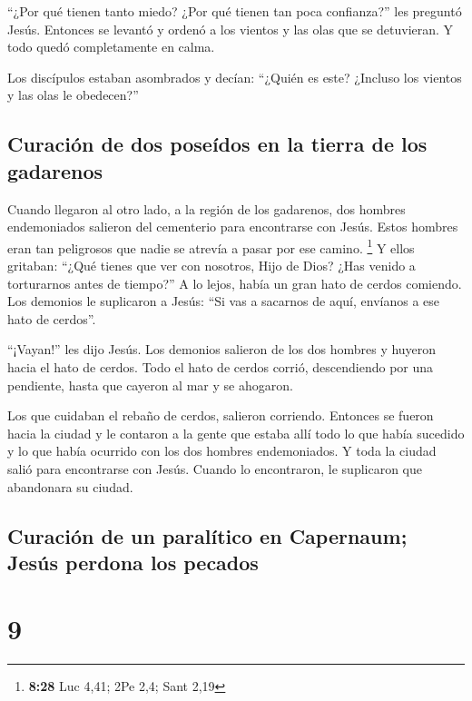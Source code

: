  ``¿Por qué tienen tanto miedo? ¿Por qué tienen tan poca
confianza?'' les preguntó Jesús. Entonces se levantó y ordenó a los
vientos y las olas que se detuvieran. Y todo quedó completamente en
calma.

 Los discípulos estaban asombrados y decían: ``¿Quién es
este? ¿Incluso los vientos y las olas le obedecen?''

\hypertarget{curaciuxf3n-de-dos-poseuxeddos-en-la-tierra-de-los-gadarenos}{%
\subsection{Curación de dos poseídos en la tierra de los
gadarenos}\label{curaciuxf3n-de-dos-poseuxeddos-en-la-tierra-de-los-gadarenos}}

 Cuando llegaron al otro lado, a la región de los
gadarenos, dos hombres endemoniados salieron del cementerio para
encontrarse con Jesús. Estos hombres eran tan peligrosos que nadie se
atrevía a pasar por ese camino. \footnote{\textbf{8:28} Luc 4,41; 2Pe
  2,4; Sant 2,19}  Y ellos gritaban: ``¿Qué tienes que
ver con nosotros, Hijo de Dios? ¿Has venido a torturarnos antes de
tiempo?''  A lo lejos, había un gran hato de cerdos
comiendo.  Los demonios le suplicaron a Jesús: ``Si vas a
sacarnos de aquí, envíanos a ese hato de cerdos''.

 ``¡Vayan!'' les dijo Jesús. Los demonios salieron de los
dos hombres y huyeron hacia el hato de cerdos. Todo el hato de cerdos
corrió, descendiendo por una pendiente, hasta que cayeron al mar y se
ahogaron.

 Los que cuidaban el rebaño de cerdos, salieron
corriendo. Entonces se fueron hacia la ciudad y le contaron a la gente
que estaba allí todo lo que había sucedido y lo que había ocurrido con
los dos hombres endemoniados.  Y toda la ciudad salió
para encontrarse con Jesús. Cuando lo encontraron, le suplicaron que
abandonara su ciudad.

\hypertarget{curaciuxf3n-de-un-paraluxedtico-en-capernaum-jesuxfas-perdona-los-pecados}{%
\subsection{Curación de un paralítico en Capernaum; Jesús perdona los
pecados}\label{curaciuxf3n-de-un-paraluxedtico-en-capernaum-jesuxfas-perdona-los-pecados}}

\hypertarget{section-8}{%
\section{9}\label{section-8}}

